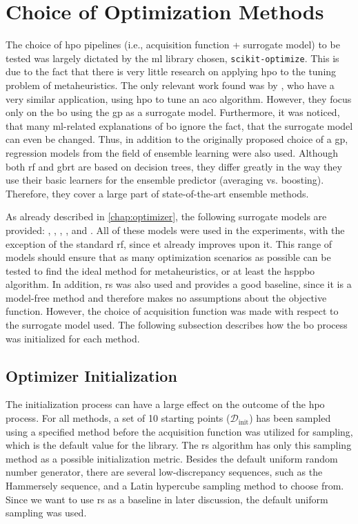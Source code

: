 \section{Choice of Optimization Methods}
\label{chap:opt-choice}

The choice of \gls{hpo} pipelines (i.e., acquisition function + surrogate model) to be tested was largely dictated by the \gls{ml} library chosen, \texttt{scikit-optimize}. This is due to the fact that there is very little research on applying \glsdesc{hpo} to the tuning problem of metaheuristics. The only relevant work found was by \citet{yin2021bayesian}, who have a very similar application, using \gls{hpo} to tune an \glsdesc{aco} algorithm. However, they focus only on the \gls{bo} using the \gls{gp} as a surrogate model. Furthermore, it was noticed, that many \gls{ml}-related explanations of \gls{bo} ignore the fact, that the surrogate model can even be changed. Thus, in addition to the originally proposed choice of a \glsdesc{gp}, regression models from the field of ensemble learning were also used. Although both \glsdesc{rf} and \glsdesc{gbrt} are based on decision trees, they differ greatly in the way they use their basic learners for the ensemble predictor (averaging vs. boosting). Therefore, they cover a large part of state-of-the-art ensemble methods.

As already described in \cref{chap:optimizer}, the following surrogate models are provided: , , , , and .
All of these models were used in the experiments, with the exception of the standard \gls{rf}, since \gls{et} already improves upon it. This range of models should ensure that as many optimization scenarios as possible can be tested to find the ideal method for metaheuristics, or at least the \gls{hsppbo} algorithm. In addition, \gls{rs} was also used and provides a good baseline, since it is a model-free method and therefore makes no assumptions about the objective function. However, the choice of acquisition function was made with respect to the surrogate model used. The following subsection describes how the \gls{bo} process was initialized for each method.

\subsection{Optimizer Initialization}
\label{chap:opt-init}
The initialization process can have a large effect on the outcome of the \gls{hpo} process. For all methods, a set of 10 starting points ($\mathcal{D}_\text{init}$) has been sampled using a specified method before the acquisition function was utilized for sampling, which is the default value for the library. The \gls{rs} algorithm has only this sampling method as a possible initialization metric. Besides the default uniform random number generator, there are several low-discrepancy sequences, such as the Hammersely sequence, and a Latin hypercube sampling method to choose from. Since we want to use \gls{rs} as a baseline in later discussion, the default uniform sampling was used.

